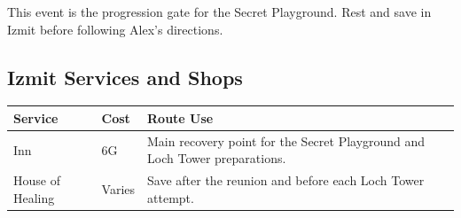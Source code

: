 \documentclass[
  american,
  10pt,
  letterpaper,
  oneside,
  open=any]{scrreprt}
\newcounter{none} %
\newenvironment{guidetable}{%
  \small\setstretch{1.0}%
  \setlength{\tabcolsep}{4pt}%
  \setlength{\LTpre}{8pt}\setlength{\LTpost}{10pt}%
  \renewcommand{\arraystretch}{1.16}%
}{ }
\begin{document}
This event is the progression gate for the Secret Playground. Rest and
save in Izmit before following Alex's directions.

\subsection{Izmit Services and Shops}\label{izmit-services-and-shops}

\begin{guidetable}

{\def\LTcaptype{none} %
\begin{longtable}[]{@{}
  >{\raggedright\arraybackslash}p{}
  >{\raggedleft\arraybackslash}p{}
  >{\raggedright\arraybackslash}p{}@{}}
\toprule\noalign{}
\begin{minipage}[b]{\linewidth}\raggedright
\color{GuideGreen}\bfseries Service
\end{minipage} & \begin{minipage}[b]{\linewidth}\raggedleft
\color{GuideGreen}\bfseries Cost
\end{minipage} & \begin{minipage}[b]{\linewidth}\raggedright
\color{GuideGreen}\bfseries Route Use
\end{minipage} \\
\midrule\noalign{}
\endhead
\bottomrule\noalign{}
\endlastfoot
Inn & 6G & Main recovery point for the Secret Playground and Loch Tower
preparations. \\
House of Healing & Varies & Save after the reunion and before each Loch
Tower attempt. \\
\end{longtable}
}

\end{guidetable}
\end{document}

